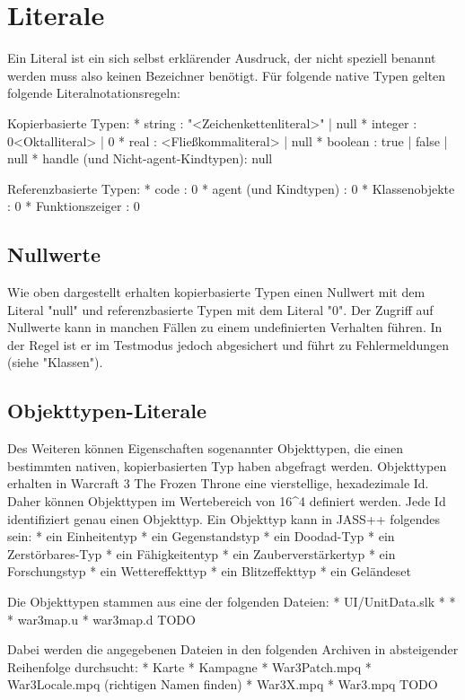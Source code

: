 \chapter { Literale }

Ein Literal ist ein sich selbst erklärender Ausdruck, der nicht speziell benannt werden muss also keinen Bezeichner benötigt.
Für folgende native Typen gelten folgende Literalnotationsregeln:

Kopierbasierte Typen:
* string : "<Zeichenkettenliteral>" | null
* integer : 0<Oktalliteral> | 0%
* real : <Fließkommaliteral> | null
* boolean : true | false | null
* handle (und Nicht-agent-Kindtypen): null

Referenzbasierte Typen:
* code : 0
* agent (und Kindtypen) : 0
* Klassenobjekte : 0
* Funktionszeiger : 0

\section { Nullwerte }
Wie oben dargestellt erhalten kopierbasierte Typen einen Nullwert mit dem Literal "null" und referenzbasierte Typen mit dem Literal "0".
Der Zugriff auf Nullwerte kann in manchen Fällen zu einem undefinierten Verhalten führen.
In der Regel ist er im Testmodus jedoch abgesichert und führt zu Fehlermeldungen (siehe "Klassen").

\section { Objekttypen-Literale }
Des Weiteren können Eigenschaften sogenannter Objekttypen, die einen bestimmten nativen, kopierbasierten Typ haben abgefragt werden.
Objekttypen erhalten in Warcraft 3 The Frozen Throne eine vierstellige, hexadezimale Id. Daher können Objekttypen im Wertebereich von 16^4 definiert werden.
Jede Id identifiziert genau einen Objekttyp.
Ein Objekttyp kann in JASS++ folgendes sein:
* ein Einheitentyp
* ein Gegenstandstyp
* ein Doodad-Typ
* ein Zerstörbares-Typ
* ein Fähigkeitentyp
* ein Zauberverstärkertyp
* ein Forschungstyp
* ein Wettereffekttyp
* ein Blitzeffekttyp
* ein Geländeset

Die Objekttypen stammen aus eine der folgenden Dateien:
* UI/UnitData.slk
*
*
* war3map.u
* war3map.d
TODO

Dabei werden die angegebenen Dateien in den folgenden Archiven in absteigender Reihenfolge durchsucht:
* Karte
* Kampagne
* War3Patch.mpq
* War3Locale.mpq (richtigen Namen finden)
* War3X.mpq
* War3.mpq
TODO

